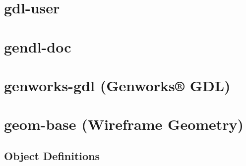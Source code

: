 \documentclass [11pt]{book}
\begin{document}
\section{gdl-user }

\label{sec:gdl-user}







\section{gendl-doc }

\label{sec:gendl-doc}







\section{genworks-gdl (Genworks® GDL)}

\label{sec:genworks-gdl(genworks®gdl)}







\section{geom-base (Wireframe Geometry)}

\label{sec:geom-base(wireframegeometry)}





\subsection{Object Definitions}

\label{subsec:objectdefinitions}
\end{document}
